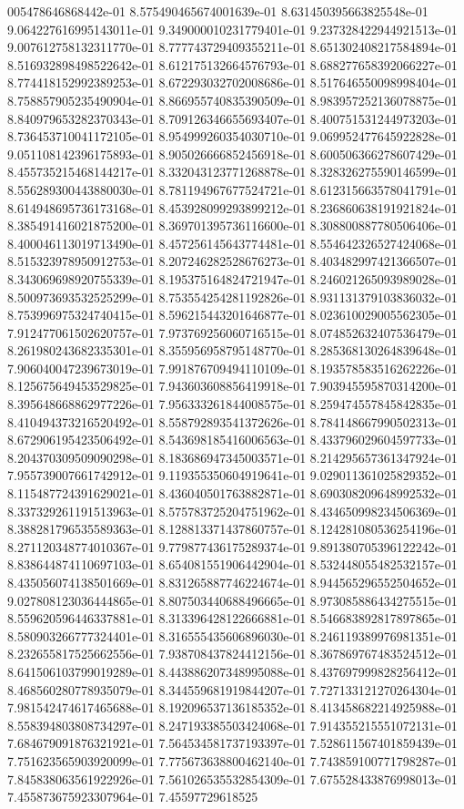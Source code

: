 005478646868442e-01	8.575490465674001639e-01	8.631450395663825548e-01	9.064227616995143011e-01	9.349000010231779401e-01	9.237328422944921513e-01	9.007612758132311770e-01	8.777743729409355211e-01	8.651302408217584894e-01	8.516932898498522642e-01	8.612175132664576793e-01	8.688277658392066227e-01	8.774418152992389253e-01	8.672293032702008686e-01	8.517646550098998404e-01	8.758857905235490904e-01	8.866955740835390509e-01	8.983957252136078875e-01	8.840979653282370343e-01	8.709126346655693407e-01	8.400751531244973203e-01	8.736453710041172105e-01	8.954999260354030710e-01	9.069952477645922828e-01	9.051108142396175893e-01	8.905026666852456918e-01	8.600506366278607429e-01	8.455735215468144217e-01	8.332043123771268878e-01	8.328326275590146599e-01	8.556289300443880030e-01	8.781194967677524721e-01	8.612315663578041791e-01	8.614948695736173168e-01	8.453928099293899212e-01	8.236860638191921824e-01	8.385491416021875200e-01	8.369701395736116600e-01	8.308800887780506406e-01	8.400046113019713490e-01	8.457256145643774481e-01	8.554642326527424068e-01	8.515323978950912753e-01	8.207246282528676273e-01	8.403482997421366507e-01	8.343069698920755339e-01	8.195375164824721947e-01	8.246021265093989028e-01	8.500973693532525299e-01	8.753554254281192826e-01	8.931131379103836032e-01	8.753996975324740415e-01	8.596215443201646877e-01	8.023610029005562305e-01	7.912477061502620757e-01	7.973769256060716515e-01	8.074852632407536479e-01	8.261980243682335301e-01	8.355956958795148770e-01	8.285368130264839648e-01	7.906040047239673019e-01	7.991876709494110109e-01	8.193578583516262226e-01	8.125675649453529825e-01	7.943603608856419918e-01	7.903945595870314200e-01	8.395648668862977226e-01	7.956333261844008575e-01	8.259474557845842835e-01	8.410494373216520492e-01	8.558792893541372626e-01	8.784148667990502313e-01	8.672906195423506492e-01	8.543698185416006563e-01	8.433796029604597733e-01	8.204370309509090298e-01	8.183686947345003571e-01	8.214295657361347924e-01	7.955739007661742912e-01	9.119355350604919641e-01	9.029011361025829352e-01	8.115487724391629021e-01	8.436040501763882871e-01	8.690308209648992532e-01	8.337329261191513963e-01	8.575783725204751962e-01	8.434650998234506369e-01	8.388281796535589363e-01	8.128813371437860757e-01	8.124281080536254196e-01	8.271120348774010367e-01	9.779877436175289374e-01	9.891380705396122242e-01	8.838644874110697103e-01	8.654081551906442904e-01	8.532448055482532157e-01	8.435056074138501669e-01	8.831265887746224674e-01	8.944565296552504652e-01	9.027808123036444865e-01	8.807503440688496665e-01	8.973085886434275515e-01	8.559620596446337881e-01	8.313396428122666881e-01	8.546683892817897865e-01	8.580903266777324401e-01	8.316555435606896030e-01	8.246119389976981351e-01	8.232655817525662556e-01	7.938708437824412156e-01	8.367869767483524512e-01	8.641506103799019289e-01	8.443886207348995088e-01	8.437697999828256412e-01	8.468560280778935079e-01	8.344559681919844207e-01	7.727133121270264304e-01	7.981542474617465688e-01	8.192096537136185352e-01	8.413458682214925988e-01	8.558394803808734297e-01	8.247193385503424068e-01	7.914355215551072131e-01	7.684679091876321921e-01	7.564534581737193397e-01	7.528611567401859439e-01	7.751623565903920099e-01	7.775673638800462140e-01	7.743859100771798287e-01	7.845838063561922926e-01	7.561026535532854309e-01	7.675528433876998013e-01	7.455873675923307964e-01	7.45597729618525